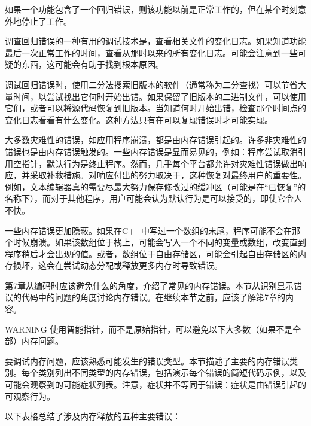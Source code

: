 
如果一个功能包含了一个回归错误，则该功能以前是正常工作的，但在某个时刻意外地停止了工作。

调查回归错误的一种有用的调试技术是，查看相关文件的变化日志。如果知道功能最后一次正常工作的时间，查看从那时以来的所有变化日志。可能会注意到一些可疑的东西，这可能会有助于找到根本原因。

调试回归错误时，使用二分法搜索旧版本的软件（通常称为二分查找）可以节省大量时间，以尝试找出它何时开始出错。如果保留了旧版本的二进制文件，可以使用它们，或者可以将源代码恢复到旧版本。当知道何时开始出错，检查那个时间点的变化日志看看有什么变化。这种方法只有在可以复现错误时才可能实现。


大多数灾难性的错误，如应用程序崩溃，都是由内存错误引起的。许多非灾难性的错误也是由内存错误触发的。一些内存错误是显而易见的，例如：程序尝试取消引用空指针，默认行为是终止程序。然而，几乎每个平台都允许对灾难性错误做出响应，并采取补救措施。对响应付出的努力取决于，这种恢复对最终用户的重要性。例如，文本编辑器真的需要尽最大努力保存修改过的缓冲区（可能是在“已恢复”的名称下），而对于其他程序，用户可能会认为默认行为是可以接受的，即使它令人不快。

一些内存错误更加隐蔽。如果在C++中写过一个数组的末尾，程序可能不会在那个时候崩溃。如果该数组位于栈上，可能会写入一个不同的变量或数组，改变直到程序稍后才会出现的值。或者，数组位于自由存储区，可能会引起自由存储区的内存损坏，这会在尝试动态分配或释放更多内存时导致错误。

第7章从编码时应该避免什么的角度，介绍了常见的内存错误。本节从识别显示错误的代码中的问题的角度讨论内存错误。在继续本节之前，应该了解第7章的内容。

\begin{myWarning}{WARNING}
使用智能指针，而不是原始指针，可以避免以下大多数（如果不是全部）内存问题。
\end{myWarning}


要调试内存问题，应该熟悉可能发生的错误类型。本节描述了主要的内存错误类别。每个类别列出不同类型的内存错误，包括演示每个错误的简短代码示例，以及可能会观察到的可能症状列表。注意，症状并不等同于错误：症状是由错误引起的可观察行为。


以下表格总结了涉及内存释放的五种主要错误：

